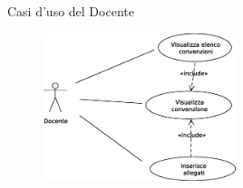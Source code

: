 \begin{frame}{}
\begin{columns}[t]
\begin{column}{0.4\textwidth}
\begin{tabular}{| l | l|}
{\begin{minipage}{0.6\textwidth}
  \vskip1ex
	\end{minipage}
	}
\\
      \hline
    \end{tabular}
      \end{column}
     \end{columns}
    \end{frame}


  
  \begin{frame}{Casi d'uso del Docente}
    \begin{figure}[h]
      \label{use_case_diag_teacher}
      \centering
      \includegraphics[width=0.5\textwidth]{images/casi_uso_docente.eps}
    \end{figure}
  \end{frame}
  
